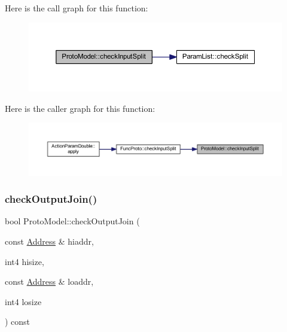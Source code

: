 Here is the call graph for this function\+:
\nopagebreak
\begin{figure}[H]
\begin{center}
\leavevmode
\includegraphics[width=350pt]{class_proto_model_a6ddc6e7d218491b657d1f5e5bb997592_cgraph}
\end{center}
\end{figure}
Here is the caller graph for this function\+:
\nopagebreak
\begin{figure}[H]
\begin{center}
\leavevmode
\includegraphics[width=350pt]{class_proto_model_a6ddc6e7d218491b657d1f5e5bb997592_icgraph}
\end{center}
\end{figure}
\mbox{\label{class_proto_model_a0e0ae91c9fa12f548418c469f63c9d1d}} 
\subsubsection{\texorpdfstring{checkOutputJoin()}{checkOutputJoin()}}
{\footnotesize\ttfamily bool Proto\+Model\+::check\+Output\+Join (\begin{DoxyParamCaption}\item[{const \mbox{\hyperlink{class_address}{Address}} \&}]{hiaddr,  }\item[{int4}]{hisize,  }\item[{const \mbox{\hyperlink{class_address}{Address}} \&}]{loaddr,  }\item[{int4}]{losize }\end{DoxyParamCaption}) const\hspace{0.3cm}{\ttfamily [inline]}}



